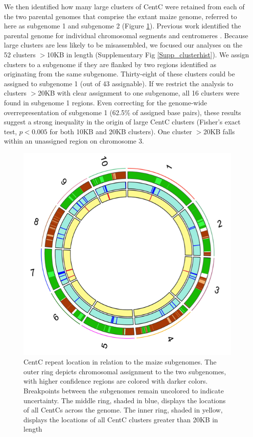 We then identified how many large clusters of CentC were retained from each of the two parental genomes that comprise the extant maize genome, referred to here as subgenome 1 and subgenome 2 (Figure \ref{circos}).  Previous work identified the parental genome for individual chromosomal segments \citep{Schnable2011} and centromeres \citep{Wang2012}.  Because large clusters are less likely to be misassembled, we focused our analyses on the 52 clusters $>$10KB in length (Supplementary Fig \ref{Supp_clusterhist}).  We assign clusters to a subgenome if they are flanked by two regions identified as originating from the same  subgenome.  Thirty-eight of these clusters could be assigned to subgenome 1 (out of 43 assignable). If we restrict the analysis to clusters  $>$20KB with clear assignment to one subgenome, all 16 clusters were found in subgenome 1 regions.  Even correcting for the genome-wide overrepresentation of subgenome 1 (62.5\% of assigned base pairs), these results suggest a strong inequality in the origin of large CentC clusters (Fisher's exact test, $p<0.005$ for both 10KB and 20KB clusters).  One cluster $>$20KB falls within an unassigned region on chromosome 3.

\begin{figure}
\includegraphics{Fig1_circos.png}
\caption{CentC repeat location in relation to the maize subgenomes.  The outer ring depicts chromosomal assignment to the two subgenomes, with higher confidence regions are colored with darker colors.  Breakpoints between the subgenomes remain uncolored to indicate uncertainty. The middle ring, shaded in blue, displays the locations of all CentCs across the genome.  The inner ring, shaded in yellow, displays the locations of all CentC clusters greater than 20KB in length}
\label{circos}    
\end{figure}

